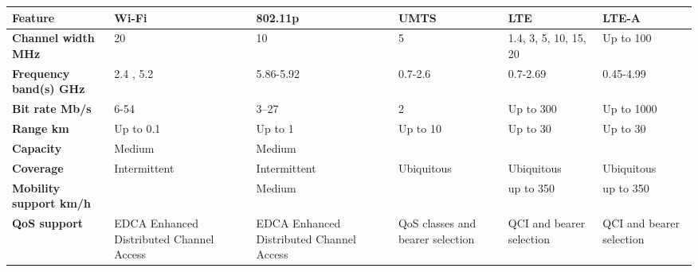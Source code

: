 \begin{table}[h!]
\begin{center}
	\begin{tabulary}{\textwidth}{L|L|L|L|L|L}
	\bf{Feature}                     & \bf{Wi-Fi}                                            & \bf{802.11p}                                          & \bf{UMTS}                        & LTE                      & LTE-A                     \\\hline
	\bf{Channel width MHz}           & 20                                                    & 10                                                    & 5                                & 1.4, 3, 5, 10, 15, 20    & Up to 100                 \\\hline
	\bf{Frequency band(s) GHz}       & 2.4 , 5.2                                             & 5.86-5.92                                             & 0.7-2.6                          & 0.7-2.69                 & 0.45-4.99                 \\\hline
	\bf{Bit rate Mb/s}               & 6-54                                                  & 3–27                                                  & 2                                & Up to 300                & Up to 1000                \\\hline
	\bf{Range km}                    & Up to 0.1                                             & Up to 1                                               & Up to 10                         & Up to 30                 & Up to 30                  \\\hline
	\bf{Capacity}                    & Medium                                                & Medium                                                & \ko                              & \ok                      & \ok                       \\\hline
	\bf{Coverage}                    & Intermittent                                          & Intermittent                                          & Ubiquitous                       & Ubiquitous               & Ubiquitous                \\\hline
	\bf{Mobility support km/h}       & \ko                                                   & Medium                                                & \ok                              & up to 350                & up to 350                 \\\hline
	\bf{QoS support}                 & EDCA \scriptsize{Enhanced Distributed Channel Access} & EDCA \scriptsize{Enhanced Distributed Channel Access} & QoS classes and bearer selection & QCI and bearer selection & QCI and bearer selection  \\\hline

\end{tabulary}
\end{center}
\end{table}
